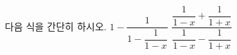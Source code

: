 다음 식을 간단히 하시오.
 $1-\dfrac{1}{1-\dfrac{1}{1-x}}$
 $\dfrac{\dfrac{1}{1-x}+\dfrac{1}{1+x}}{\dfrac{1}{1-x}-\dfrac{1}{1+x}}$
